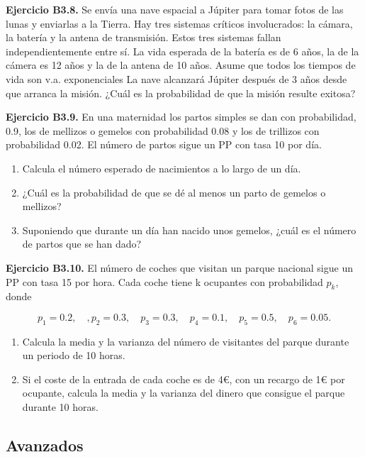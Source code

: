 \documentclass[
]{book}
\providecommand{\tightlist}{%
  \setlength{\itemsep}{0pt}\setlength{\parskip}{0pt}}
\theoremstyle{definition}
\theoremstyle{definition}
\theoremstyle{definition}
\theoremstyle{definition}
\theoremstyle{remark}
\begin{document}
\textbf{Ejercicio B3.8.} Se envía una nave espacial a Júpiter para tomar fotos de las lunas y enviarlas a la Tierra. Hay tres sistemas críticos involucrados: la cámara, la batería y la antena de transmisión. Estos tres sistemas fallan independientemente entre sí. La vida esperada de la batería es de 6 años, la de la cámera es 12 años y la de la antena de 10 años. Asume que todos los tiempos de vida son v.a. exponenciales La nave alcanzará Júpiter después de 3 años desde que arranca la misión. ¿Cuál es la probabilidad de que la misión resulte exitosa?

\textbf{Ejercicio B3.9.} En una maternidad los partos simples se dan con probabilidad, 0.9, los de mellizos o gemelos con probabilidad 0.08 y los de trillizos con probabilidad 0.02. El número de partos sigue un PP con tasa 10 por día.

\begin{enumerate}
\def\labelenumi{\arabic{enumi}.}
\tightlist
\item
  Calcula el número esperado de nacimientos a lo largo de un día.
\item
  ¿Cuál es la probabilidad de que se dé al menos un parto de gemelos o mellizos?
\item
  Suponiendo que durante un día han nacido unos gemelos, ¿cuál es el número de partos que se han dado?
\end{enumerate}

\textbf{Ejercicio B3.10.} El número de coches que visitan un parque nacional sigue un PP con tasa 15 por hora. Cada coche tiene k ocupantes con probabilidad \(p_k\), donde

\[p_1=0.2, \quad, p_2=0.3, \quad p_3=0.3, \quad p_4=0.1, \quad p_5=0.5, \quad p_6=0.05.\]

\begin{enumerate}
\def\labelenumi{\arabic{enumi}.}
\tightlist
\item
  Calcula la media y la varianza del número de visitantes del parque durante un periodo de 10 horas.
\item
  Si el coste de la entrada de cada coche es de 4€, con un recargo de 1€ por ocupante, calcula la media y la varianza del dinero que consigue el parque durante 10 horas.
\end{enumerate}

\hypertarget{avanzados-2}{%
\subsection{Avanzados}\label{avanzados-2}}
\end{document}
